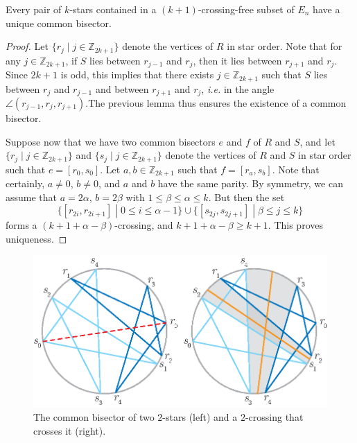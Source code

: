 \documentclass[12pt]{amsart}
\begin{document}
\begin{theorem}\label{common bisector}
Every pair of $k$-stars contained in a $(k+1)$-crossing-free subset of $E_n$ have a unique common bisector.
\end{theorem}

\begin{proof}
Let $\{r_j\;|\; j\in\mathbb{Z}_{2k+1}\}$ denote the vertices of $R$ in star order. Note that for any $j\in\mathbb{Z}_{2k+1}$, if $S$ lies between $r_{j-1}$ and $r_j$, then it lies between $r_{j+1}$ and $r_j$. Since $2k+1$ is odd, this implies that there exists $j\in\mathbb{Z}_{2k+1}$ such that $S$ lies between $r_j$ and $r_{j-1}$ and between $r_{j+1}$ and $r_j$, {\it i.e.} in the angle $\angle(r_{j-1},r_j,r_{j+1})$.The previous lemma thus ensures the existence of a common bisector.

Suppose now that we have two common bisectors $e$ and $f$  of $R$ and $S$, and let $\{r_j\;|\; j\in\mathbb{Z}_{2k+1}\}$ and $\{s_j\;|\; j\in\mathbb{Z}_{2k+1}\}$ denote the vertices of $R$ and $S$ in star order such that $e=[r_0,s_0]$. Let $a,b\in\mathbb{Z}_{2k+1}$ such that $f=[r_a,s_b]$.
Note that certainly, $a\ne0$, $b\ne0$, and $a$ and $b$ have the same parity. By symmetry, we can assume that $a=2\alpha$, $b=2\beta$ with $1\le\beta\le\alpha\le k$. But then the set
$$\{[r_{2i},r_{2i+1}]\;|\; 0\le i\le \alpha-1\}\cup\{[s_{2j},s_{2j+1}]\;|\; \beta\le j\le k\}$$
forms a $(k+1+\alpha-\beta)$-crossing, and $k+1+\alpha-\beta\ge k+1$. This proves uniqueness.\end{proof}

\begin{figure}
\centerline{\includegraphics[scale=1]{combisector.eps}}
\caption{\small{The common bisector of two $2$-stars (left) and a $2$-crossing that crosses it (right).}}\label{combisector}
\end{figure}
\end{document}
